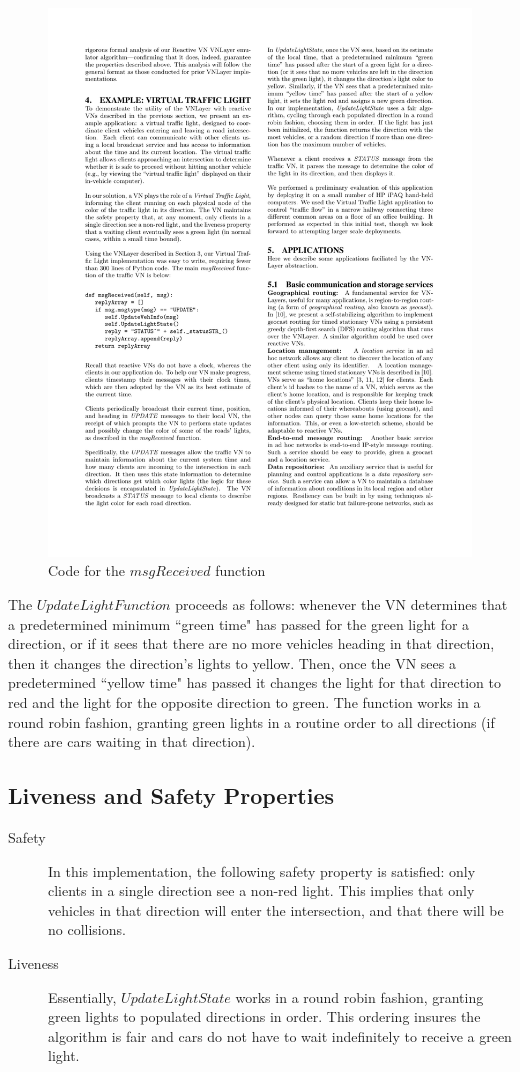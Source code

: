 \documentclass[12pt]{article}
\begin{document}
\begin{figure}
\begin{center}
\includegraphics[width=.65\textwidth]{vnlayerAlg.pdf}
\caption{Code for the $msgReceived$ function \cite{vnlayer}}
\label{fig:vnlayerAlg}
\end{center}
\end{figure}
The $UpdateLightFunction$ proceeds as follows: whenever the VN determines that a predetermined minimum ``green time" has passed for the green light for a direction, or if it sees that there are no more vehicles heading in that direction, then it changes the direction's lights to yellow.  Then, once the VN sees a predetermined ``yellow time" has passed it changes the light for that direction to red and the light for the opposite direction to green.  The function works in a round robin fashion, granting green lights in a routine order to all directions (if there are cars waiting in that direction). 

\subsection{Liveness and Safety Properties}
\begin{description}
\item[Safety]
 In this implementation, the following safety property is satisfied: only clients in a single direction see a non-red light. This implies that only vehicles in that direction will enter the intersection, and that there will be no collisions.
\item[Liveness] 
 Essentially, $UpdateLightState$ works in a round robin fashion, granting green lights to populated directions in order.  This ordering insures the algorithm is fair and cars do not have to wait indefinitely to receive a green light. 
\end{description}
\end{document}
